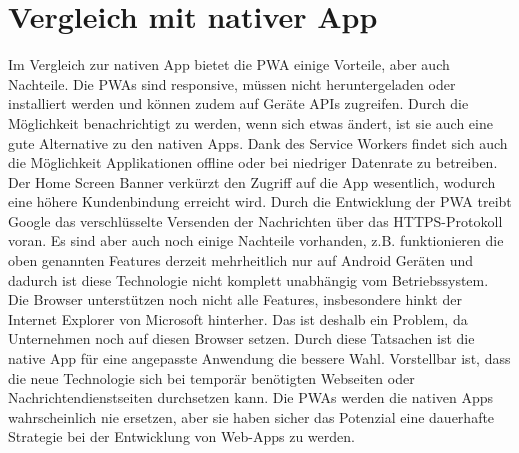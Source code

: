 \section{Vergleich mit nativer App}
Im Vergleich zur nativen App bietet die \acl{PWA} einige Vorteile, aber auch Nachteile. Die \acs{PWA}s sind responsive, müssen nicht heruntergeladen oder\\ installiert werden und können zudem auf Geräte APIs zugreifen. Durch die Möglichkeit benachrichtigt zu werden, wenn sich etwas ändert, ist sie auch eine gute Alternative zu den nativen Apps.
Dank des Service Workers findet sich auch die Möglichkeit Applikationen offline oder bei niedriger Datenrate zu betreiben. 
Der Home Screen Banner verkürzt den Zugriff auf die App wesentlich, wodurch eine höhere Kundenbindung erreicht wird.  
Durch die Entwicklung der \acs{PWA} treibt Google das verschlüsselte Versenden der Nachrichten über das HTTPS-Protokoll voran.
Es sind aber auch noch einige Nachteile vorhanden, z.B. funktionieren die oben genannten Features derzeit mehrheitlich nur auf Android Geräten und dadurch ist diese Technologie nicht komplett unabhängig vom Betriebssystem.
Die Browser unterstützen noch nicht alle Features, insbesondere hinkt der Internet Explorer von Microsoft hinterher. Das ist deshalb ein Problem, da Unternehmen noch auf diesen Browser setzen. 
Durch diese Tatsachen ist die native App für eine angepasste Anwendung die bessere Wahl. 
Vorstellbar ist, dass die neue Technologie sich bei temporär benötigten Webseiten oder Nachrichtendienstseiten durchsetzen kann.
Die \acs{PWA}s werden die nativen Apps wahrscheinlich nie ersetzen, aber sie haben sicher das Potenzial eine dauerhafte Strategie bei der Entwicklung von \acs{Web-App}s zu werden.



